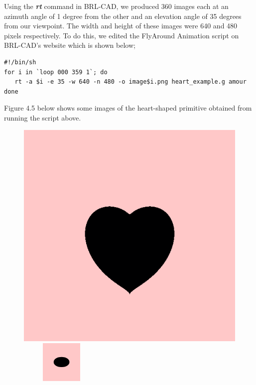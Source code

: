 \hspace{30} Using the \textit{\textbf{rt}} command in BRL-­CAD, we produced 360 images each at an  
azimuth angle of 1 degree from the other and an elevation angle of 35 degrees from our viewpoint.
The width and height   of   these   images   were   640   and   480  
pixels   respectively. To   do   this,   we   edited   the   Fly­Around   Animation   script   \cite{42}  
on BRL­-CAD's website which is shown below;
\begin{verbatim}
#!/bin/sh 
for i in `loop 000 359 1`; do 
   rt -­a $i ­-e 35 -­w 640 -­n 480 -­o image$i.png heart_example.g amour 
done 
\end{verbatim}
Figure 4.5 below shows some images of the heart­-shaped primitive obtained from running the script above.

\begin{figure}[htbp]
\centering
\includegraphics[trim=0.0cm 0.5cm 0.1cm 0.1cm, clip=true, totalheight=0.4\textheight]{Pictures/Besides.png}
\begin{minipage}{0.2\textheight}
\begin{flushleft}
\includegraphics[width=4cm,height=2cm, clip=true, totalheight=0.17\textheight]{Pictures/Above.png}

\end{flushleft}
\end{minipage}
\end{figure}
